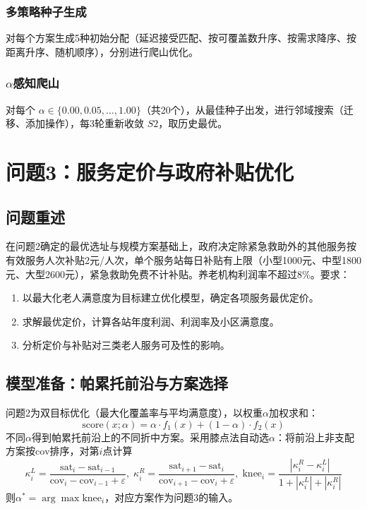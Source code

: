 \documentclass[12pt,a4paper]{article}
\begin{document}
\subsubsection{多策略种子生成}
对每个方案生成5种初始分配（延迟接受匹配、按可覆盖数升序、按需求降序、按距离升序、随机顺序），分别进行爬山优化。

\subsubsection{$\alpha$感知爬山}
对每个 $\alpha \in \{0.00,0.05,\dots,1.00\}$（共20个），从最佳种子出发，进行邻域搜索（迁移、添加操作），每3轮重新收敛 $S2$，取历史最优。

\section{问题3：服务定价与政府补贴优化}

\subsection{问题重述}
在问题2确定的最优选址与规模方案基础上，政府决定除紧急救助外的其他服务按有效服务人次补贴2元/人次，单个服务站每日补贴有上限（小型1000元、中型1800元、大型2600元），紧急救助免费不计补贴。养老机构利润率不超过8\%。要求：
\begin{enumerate}
    \item 以最大化老人满意度为目标建立优化模型，确定各项服务最优定价。
    \item 求解最优定价，计算各站年度利润、利润率及小区满意度。
    \item 分析定价与补贴对三类老人服务可及性的影响。
\end{enumerate}

\subsection{模型准备：帕累托前沿与方案选择}
问题2为双目标优化（最大化覆盖率与平均满意度），以权重$\alpha$加权求和：
\begin{equation}
\text{score}(x;\alpha) = \alpha\cdot f_1(x) + (1-\alpha)\cdot f_2(x)
\label{eq:pareto}
\end{equation}
不同$\alpha$得到帕累托前沿上的不同折中方案。采用膝点法自动选$\alpha$：将前沿上非支配方案按$\text{cov}$排序，对第$i$点计算
\begin{equation}
\kappa_i^L = \frac{\text{sat}_i - \text{sat}_{i-1}}{\text{cov}_i - \text{cov}_{i-1} + \varepsilon},\;
\kappa_i^R = \frac{\text{sat}_{i+1} - \text{sat}_i}{\text{cov}_{i+1} - \text{cov}_i + \varepsilon},\;
\text{knee}_i = \frac{|\kappa_i^R - \kappa_i^L|}{1 + |\kappa_i^L| + |\kappa_i^R|}
\label{eq:knee}
\end{equation}
则$\alpha^* = \arg\max \text{knee}_i$，对应方案作为问题3的输入。
\end{document}

